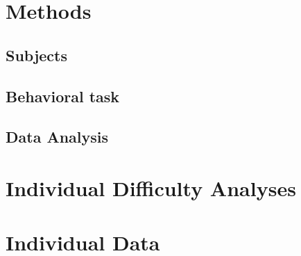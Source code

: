 \documentclass[9pt,biorxiv,lineno,onehalfspacing]{lapreprint}
\begin{document}
\begin{refsection}
\newpage
\section{Methods}
\subsection{Subjects}

\subsection{Behavioral task}

\subsection{Data Analysis}






\section{Individual Difficulty Analyses}
\label{app:Indi_difficulty}


\section{Individual Data}
\label{app:IndDiffs}


%     

% 


\end{refsection}
\end{document}
